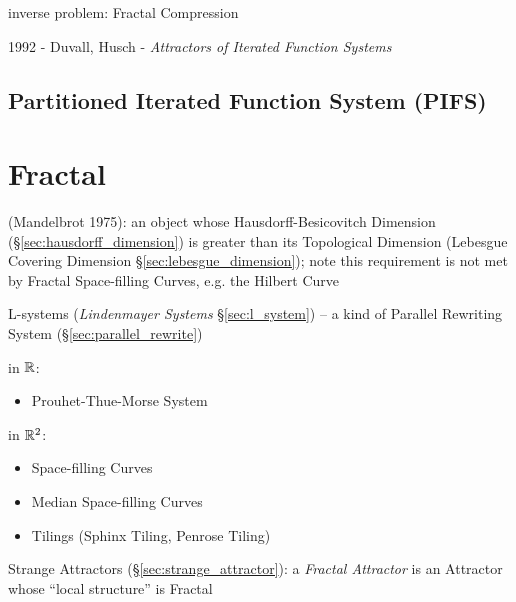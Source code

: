 inverse problem: Fractal Compression

1992 - Duvall, Husch - \emph{Attractors of Iterated Function Systems}



\subsection{Partitioned Iterated Function System (PIFS)}\label{sec:pifs}



\section{Fractal}\label{sec:fractal}

(Mandelbrot 1975): an object whose Hausdorff-Besicovitch Dimension
(\S\ref{sec:hausdorff_dimension}) is greater than its Topological Dimension
(Lebesgue Covering Dimension \S\ref{sec:lebesgue_dimension}); note this
requirement is not met by Fractal Space-filling Curves, e.g. the Hilbert Curve

\asterism

L-systems (\emph{Lindenmayer Systems} \S\ref{sec:l_system}) -- a kind of
Parallel Rewriting System (\S\ref{sec:parallel_rewrite})


in $\mathbb{R}$:
\begin{itemize}
  \item Prouhet-Thue-Morse System
\end{itemize}

in $\mathbb{R}^2$:
\begin{itemize}
  \item Space-filling Curves
  \item Median Space-filling Curves
  \item Tilings (Sphinx Tiling, Penrose Tiling)
\end{itemize}

\fist Strange Attractors (\S\ref{sec:strange_attractor}): a \emph{Fractal
  Attractor} is an Attractor whose ``local structure'' is Fractal



